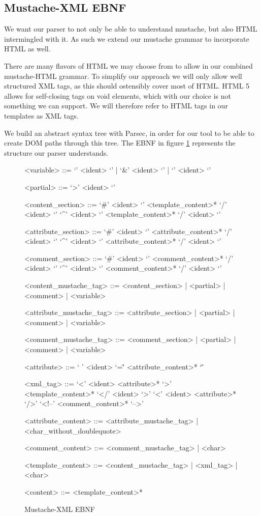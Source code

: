 \documentclass[thesis.tex]{subfiles}
\begin{document}
\subsection{Mustache-XML EBNF}
\label{sec:mustache-xml-ebnf}
We want our parser to not only be able to understand mustache, but also HTML
intermingled with it. As such we extend our mustache grammar to incorporate
HTML as well.

There are many flavors of HTML we may choose from to allow in our
combined mustache-HTML grammar. To simplify our approach we will only allow well
structured XML tags, as this should ostensibly cover most of HTML.
HTML 5 allows for self-closing tags on void elements, which with our choice is
not something we can support. We will therefore refer to HTML tags in our
templates as XML tags.

We build an abstract syntax tree with Parsec, in order for our tool to be
able to create DOM paths through this tree.
The EBNF in figure \ref{fig:mustache-xml.ebnf} represents the structure our
parser understands.

\begin{figure}
	\centering
	\setlength{\grammarindent}{4.2cm}
	\begin{grammar}
<variable> ::= `{{{' <ident> `}}}' | `{{&' <ident> `}}' | `{{' <ident> `}}'

<partial> ::= `{{>' <ident> `}}'

<content\_section> ::= `{{#' <ident> `}}' <template\_content>* `{{/' <ident> `}}'
                  \alt `{{^' <ident> `}}' <template\_content>* `{{/' <ident> `}}'

<attribute\_section> ::= `{{#' <ident> `}}' <attribute\_content>* `{{/' <ident> `}}'
                    \alt `{{^' <ident> `}}' <attribute\_content>* `{{/' <ident> `}}'

<comment\_section> ::= `{{\#' <ident> `}}' <comment\_content>* `{{/' <ident> `}}'
                  \alt `{{^' <ident> `}}' <comment\_content>* `{{/' <ident> `}}'

<content\_mustache\_tag> ::= <content\_section> | <partial> | <comment> | <variable>

<attribute\_mustache\_tag> ::= <attribute\_section> | <partial> | <comment> | <variable>

<comment\_mustache\_tag> ::= <comment\_section> | <partial> | <comment> | <variable>

<attribute> ::= ` ' <ident> `=\"' <attribute\_content>* `\"' 

<xml\_tag> ::= `<' <ident> <attribute>* `>' <template\_content>* `</' <ident> `>'
          \alt `<' <ident> <attribute>* `/>'
          \alt `<!--' <comment\_content>* `-->'

<attribute\_content> ::= <attribute\_mustache\_tag> | <char\_without\_doublequote>

<comment\_content> ::= <comment\_mustache\_tag> | <char>

<template\_content> ::= <content\_mustache\_tag> | <xml\_tag> | <char>

<content> ::= <template\_content>*
	\end{grammar}
	\caption{Mustache-XML EBNF}
	\label{fig:mustache-xml.ebnf}
\end{figure}
\end{document}
